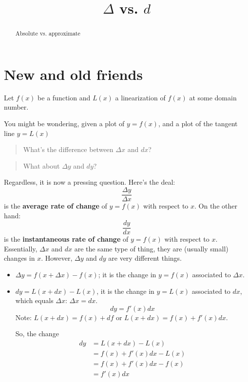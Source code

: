 \documentclass{ximera}
\title{$\Delta$ vs. $d$}
\begin{document}
\begin{abstract}
Absolute vs. approximate
\end{abstract}
\maketitle





\section{New and old friends}


Let $f(x)$ be a function and $L(x)$ a linearization of $f(x)$ at some domain number.

You might be wondering, given a plot of $y=f(x)$, and a plot of the tangent line $y=L(x)$



\begin{quote}
  What's the difference between $\Delta x$ and $dx$? 
\end{quote}


\begin{quote}
  What about $\Delta y$ and $dy$?
\end{quote}




Regardless, it is now a pressing question. Here's the deal: 
\[
\frac{\Delta y}{\Delta x}
\]
is the \textbf{average rate of change} of $y=f(x)$ with respect to $x$.
On the other hand:
\[
\frac{dy}{dx}
\]
is the \textbf{instantaneous rate of change} of $y=f(x)$ with respect to
$x$. Essentially, $\Delta x$ and $dx$ are the same type of thing,
they are (usually small) changes in $x$. However, $\Delta y$ and $dy$ are very different things.




\begin{itemize}
\item $\Delta y=f(x+\Delta x)-f(x)$; it  is the change in $y=f(x)$ associated to $\Delta x$.
\item $dy=L(x+dx)-L(x)$, it is the change in $y=L(x)$ associated to $dx$, which equals $\Delta x$: $\Delta x=dx$.
  \[
  dy =f'(x)dx
  \]
  Note: $ L(x+dx)= f(x)+df$ or $ L(x+dx)= f(x)+f'(x)dx$.
   
  So, the change
  \begin{align*}
    dy &= L(x+dx)-L(x)\\
    &= f(x)+f'(x)dx-L(x)\\
    &= f(x)+f'(x)dx-f(x)\\
    &=f'(x)dx
  \end{align*}
\end{itemize}
\end{document}
